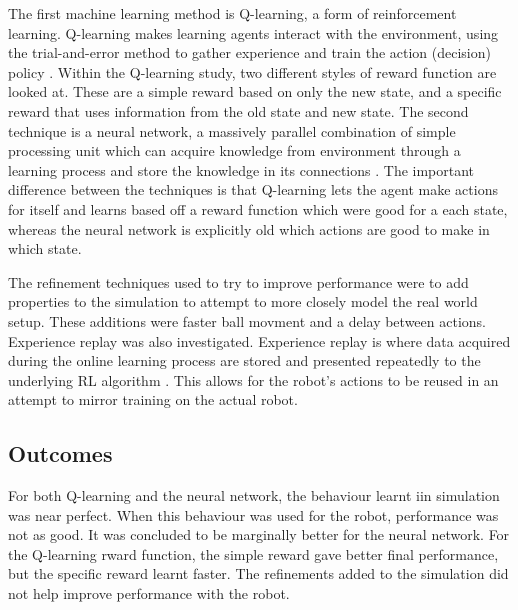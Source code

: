 \documentclass[12pt,a4paper]{article}
\begin{document}
The first machine learning method is Q-learning, a form of reinforcement learning. Q-learning makes learning agents interact with the environment, using the trial-and-error method to gather experience and train the action (decision) policy \cite{nao_balance}. Within the Q-learning study, two different styles of reward function are looked at. These are a simple reward based on only the new state, and a specific reward that uses information from the old state and new state. The second technique is a neural network, a massively parallel combination of simple processing unit which can acquire knowledge from environment through a learning process and store the knowledge in its connections \cite{nn_def}. The important difference between the techniques is that Q-learning lets the agent make actions for itself and learns based off a reward function which were good for a each state, whereas the neural network is explicitly old which actions are good to make in which state.

The refinement techniques used to try to improve performance were to add properties to the simulation to attempt to more closely model the real world setup. These additions were faster ball movment and a delay between actions. Experience replay was also investigated. Experience replay is where data acquired during the online learning process are stored and presented repeatedly to the underlying RL algorithm \cite{er}. This allows for the robot's actions to be reused in an attempt to mirror training on the actual robot.

\subsection{Outcomes}
For both Q-learning and the neural network, the behaviour learnt iin simulation was near perfect. When this behaviour was used for the robot, performance was not as good. It was concluded to be marginally better for the neural network. For the Q-learning rward function, the simple reward gave better final performance, but the specific reward learnt faster. The refinements added to the simulation did not help improve performance with the robot. 
\end{document}
